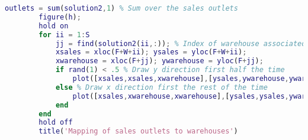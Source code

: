 \begin{lstlisting}[language = Matlab]
        outlets = sum(solution2,1) % Sum over the sales outlets
        figure(h);
        hold on
        for ii = 1:S
            jj = find(solution2(ii,:)); % Index of warehouse associated with ii
            xsales = xloc(F+W+ii); ysales = yloc(F+W+ii);
            xwarehouse = xloc(F+jj); ywarehouse = yloc(F+jj);
            if rand(1) < .5 % Draw y direction first half the time
                plot([xsales,xsales,xwarehouse],[ysales,ywarehouse,ywarehouse],'g--')
            else % Draw x direction first the rest of the time
                plot([xsales,xwarehouse,xwarehouse],[ysales,ysales,ywarehouse],'g--')
            end
        end
        hold off
        title('Mapping of sales outlets to warehouses')
        \end{lstlisting}


